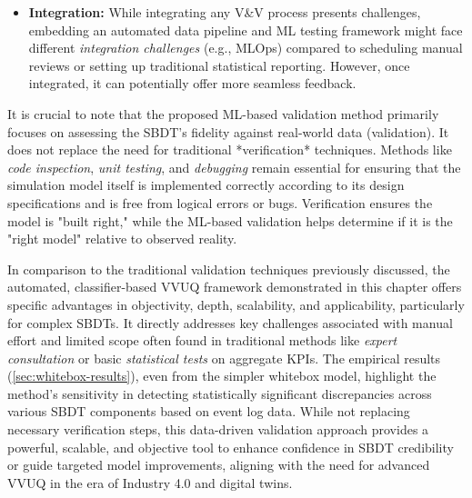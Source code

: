 \begin{itemize}
    \item \textbf{Integration:} While integrating any V&V process presents challenges, embedding an automated data pipeline and ML testing framework might face different \textit{integration challenges} (e.g., MLOps) compared to scheduling manual reviews or setting up traditional statistical reporting. However, once integrated, it can potentially offer more seamless feedback.
\end{itemize}

It is crucial to note that the proposed ML-based validation method primarily focuses on assessing the SBDT's fidelity against real-world data (validation). It does not replace the need for traditional *verification* techniques. Methods like \textit{code inspection}, \textit{unit testing}, and \textit{debugging} remain essential for ensuring that the simulation model itself is implemented correctly according to its design specifications and is free from logical errors or bugs. Verification ensures the model is "built right," while the ML-based validation helps determine if it is the "right model" relative to observed reality.

In comparison to the traditional validation techniques previously discussed, the automated, classifier-based VVUQ framework demonstrated in this chapter offers specific advantages in objectivity, depth, scalability, and applicability, particularly for complex SBDTs. It directly addresses key challenges associated with manual effort and limited scope often found in traditional methods like \textit{expert consultation} or basic \textit{statistical tests} on aggregate KPIs. The empirical results (\autoref{sec:whitebox-results}), even from the simpler whitebox model, highlight the method's sensitivity in detecting statistically significant discrepancies across various SBDT components based on event log data. While not replacing necessary verification steps, this data-driven validation approach provides a powerful, scalable, and objective tool to enhance confidence in SBDT credibility or guide targeted model improvements, aligning with the need for advanced VVUQ in the era of Industry 4.0 and digital twins.

